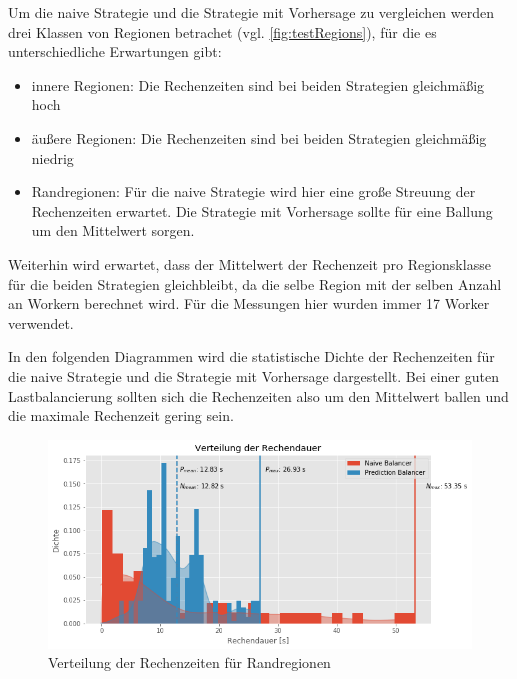 Um die naive Strategie und die Strategie mit Vorhersage zu vergleichen werden drei Klassen von Regionen betrachet (vgl. \autoref{fig:testRegions}), für die es unterschiedliche Erwartungen gibt:

\begin{itemize}
	\item innere Regionen: Die Rechenzeiten sind bei beiden Strategien gleichmäßig hoch
	\item äußere Regionen: Die Rechenzeiten sind bei beiden Strategien gleichmäßig niedrig
	\item Randregionen: Für die naive Strategie wird hier eine große Streuung der Rechenzeiten erwartet. Die Strategie mit Vorhersage sollte für eine Ballung um den Mittelwert sorgen.
\end{itemize}

Weiterhin wird erwartet, dass der Mittelwert der Rechenzeit pro Regionsklasse für die beiden Strategien gleichbleibt, da die selbe Region mit der selben Anzahl an Workern berechnet wird.
Für die Messungen hier wurden immer 17 Worker verwendet.

In den folgenden Diagrammen wird die statistische Dichte der Rechenzeiten für die naive Strategie und die Strategie mit Vorhersage dargestellt.
Bei einer guten Lastbalancierung sollten sich die Rechenzeiten also um den Mittelwert ballen und die maximale Rechenzeit gering sein.

\begin{figure}
	\centering
	\includegraphics[width=0.9\linewidth]{img/Evaluation/balancers/balancers_border.png}
	\caption{Verteilung der Rechenzeiten für Randregionen}
	\label{fig:balancers_border}
\end{figure}

